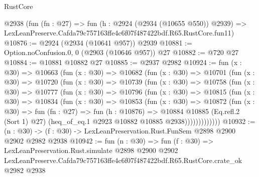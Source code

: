 \begin{lexlean}{RustCore}
\begin{coremodule}
    @2938
    (fun (fn : @27) =>
    fun (h : @2924 (@2934 (@10655 @550)) @2939) =>
    LexLeanPreserve.Cafda79c757163ffe4c6f07f487422bdf.R65.RustCore.fun11)
@10876 := @2924 (@2934 (@10641 @957)) @2939
@10881 := Option.noConfusion.{0, 0} (@2903 (@10646 @957)) @27
@10882 := @720 @27
@10884 := @10881 @10882 @27
@10885 := @2937 @2982
@10924 := fun (x : @30) =>
  @10663
    (fun (x : @30) =>
    @10682
      (fun (x : @30) =>
      @10701
        (fun (x : @30) =>
        @10720
          (fun (x : @30) =>
          @10739
            (fun (x : @30) =>
            @10758
              (fun (x : @30) =>
              @10777
                (fun (x : @30) =>
                @10796
                  (fun (x : @30) =>
                  @10815
                    (fun (x : @30) =>
                    @10834
                      (fun (x : @30) =>
                      @10853
                        (fun (x : @30) =>
                        @10872
                          (fun (x : @30) =>
                          fun (fn : @27) =>
                          fun (h : @10876) =>
                          @10884
                            @10885
                            (Eq.refl.{2} (Sort 1) @27)
                            (heq_of_eq.{1} @2923 @10882 @10885 @2938)))))))))))))
@10932 := (n : @30) -> (f : @30) -> LexLeanPreservation.Rust.FunSem @2898 @2900 @2902 @2982 @2938
@10942 := fun (n : @30) =>
  fun (f : @30) =>
  LexLeanPreservation.Rust.simulate
    @2898
    @2900
    @2902
    LexLeanPreserve.Cafda79c757163ffe4c6f07f487422bdf.R65.RustCore.crate_ok
    @2982
    @2938
\end{coremodule}
\end{lexlean}
